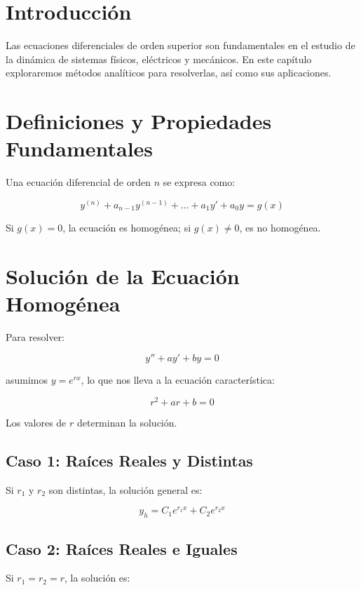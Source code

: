 \section{Introducción}
Las ecuaciones diferenciales de orden superior son fundamentales en el estudio de la dinámica de sistemas físicos, eléctricos y mecánicos. En este capítulo exploraremos métodos analíticos para resolverlas, así como sus aplicaciones.

\section{Definiciones y Propiedades Fundamentales}
Una ecuación diferencial de orden \( n \) se expresa como:

\begin{equation}
y^{(n)} + a_{n-1} y^{(n-1)} + \dots + a_1 y' + a_0 y = g(x)
\end{equation}

Si \( g(x) = 0 \), la ecuación es homogénea; si \( g(x) \neq 0 \), es no homogénea.

\section{Solución de la Ecuación Homogénea}
Para resolver:

\begin{equation}
y'' + ay' + by = 0
\end{equation}

asumimos \( y = e^{rx} \), lo que nos lleva a la ecuación característica:

\begin{equation}
r^2 + ar + b = 0
\end{equation}

Los valores de \( r \) determinan la solución.

\subsection*{Caso 1: Raíces Reales y Distintas}
Si \( r_1 \) y \( r_2 \) son distintas, la solución general es:

\begin{equation}
y_h = C_1 e^{r_1 x} + C_2 e^{r_2 x}
\end{equation}

\subsection*{Caso 2: Raíces Reales e Iguales}
Si \( r_1 = r_2 = r \), la solución es:

